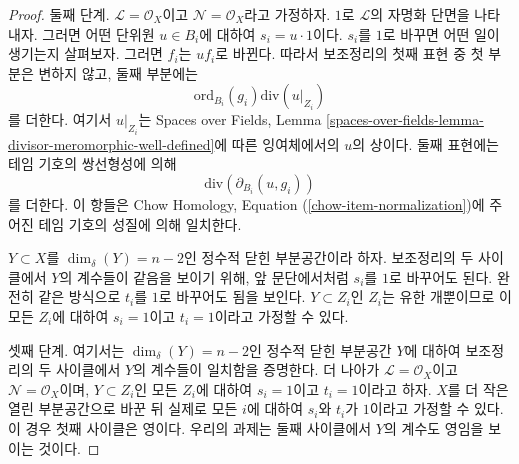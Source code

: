 \begin{proof}
\medskip\noindent
둘째 단계. $\mathcal{L} = \mathcal{O}_X$이고
$\mathcal{N} = \mathcal{O}_X$라고 가정하자. $1$로
$\mathcal{L}$의 자명화 단면을 나타내자. 그러면 어떤 단위원
$u \in B_i$에 대하여 $s_i = u \cdot 1$이다. $s_i$를 $1$로
바꾸면 어떤 일이 생기는지 살펴보자. 그러면 $f_i$는 $u f_i$로
바뀐다. 따라서 보조정리의 첫째 표현 중 첫 부분은 변하지 않고,
둘째 부분에는
$$
\text{ord}_{B_i}(g_i)\text{div}(u|_{Z_i})
$$
를 더한다. 여기서 $u|_{Z_i}$는 Spaces over Fields, Lemma
\ref{spaces-over-fields-lemma-divisor-meromorphic-well-defined}에
따른 잉여체에서의 $u$의 상이다. 둘째 표현에는 테임 기호의
쌍선형성에 의해
$$
\text{div}(\partial_{B_i}(u, g_i))
$$
를 더한다. 이 항들은 Chow Homology, Equation
(\ref{chow-item-normalization})에 주어진 테임 기호의 성질에 의해
일치한다.

\medskip\noindent
$Y \subset X$를 $\dim_\delta(Y) = n - 2$인 정수적 닫힌
부분공간이라 하자.
보조정리의 두 사이클에서 $Y$의 계수들이 같음을 보이기 위해,
앞 문단에서처럼 $s_i$를 $1$로 바꾸어도 된다. 완전히 같은 방식으로
$t_i$를 $1$로 바꾸어도 됨을 보인다. $Y \subset Z_i$인 $Z_i$는
유한 개뿐이므로 이 모든 $Z_i$에 대하여 $s_i = 1$이고
$t_i = 1$이라고 가정할 수 있다.

\medskip\noindent
셋째 단계. 여기서는 $\dim_\delta(Y) = n - 2$인 정수적 닫힌
부분공간 $Y$에 대하여 보조정리의 두 사이클에서 $Y$의 계수들이
일치함을 증명한다. 더 나아가 $\mathcal{L} = \mathcal{O}_X$이고
$\mathcal{N} = \mathcal{O}_X$이며, $Y \subset Z_i$인 모든 $Z_i$에
대하여 $s_i = 1$이고 $t_i = 1$이라고 하자. $X$를 더 작은 열린
부분공간으로 바꾼 뒤 실제로 모든 $i$에 대하여 $s_i$와 $t_i$가
$1$이라고 가정할 수 있다. 이 경우 첫째 사이클은 영이다. 우리의
과제는 둘째 사이클에서 $Y$의 계수도 영임을 보이는 것이다.


\end{proof}
